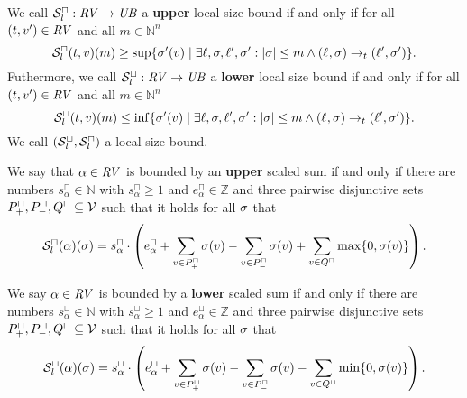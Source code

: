 \begin{definition}
  We call ${\mathcal{S}^\sqcap_l}: \mathit{RV} \rightarrow \mathit{UB}$ a \textbf{upper} local size bound if and only if for all $(t, v') \in \mathit{RV}$ and all $m \in \mathbb{N}^n$
  \[ {\mathcal{S}^\sqcap_l}(t, v)(m) \geq \sup \lbrace \sigma'(v) \mid \exists \ell, \sigma, \ell', \sigma': \left|\sigma\right| \leq m \wedge (\ell_{}, \sigma_{}) \rightarrow_t (\ell', \sigma') \rbrace. \]
  Futhermore, we call ${\mathcal{S}^\sqcup_l}: \mathit{RV} \rightarrow \mathit{UB}$ a \textbf{lower} local size bound if and only if for all $(t, v') \in \mathit{RV}$ and all $m \in \mathbb{N}^n$
  \[ {\mathcal{S}^\sqcup_l}(t, v)(m) \leq \inf \lbrace \sigma'(v) \mid \exists \ell, \sigma, \ell', \sigma': \left|\sigma\right| \leq m \wedge (\ell_{}, \sigma_{}) \rightarrow_t (\ell', \sigma') \rbrace. \]
  We call ${({\mathcal{S}^\sqcup_l}, {\mathcal{S}^\sqcap_l})}$ a local size bound.
\end{definition}

\begin{definition}
  We say that $\alpha \in \mathit{RV}$ is bounded by an \textbf{upper} scaled sum if and only if there are numbers $s^\sqcap_\alpha \in \mathbb{N}$ with $s^\sqcap_\alpha \geq 1$ and $e^\sqcap_\alpha \in \mathbb{Z}$ and three pairwise disjunctive sets $P_+^\sqcap, P_-^\sqcap, Q^\sqcap \subseteq \mathcal{V}$ such that it holds for all $\sigma$ that
  \[ {\mathcal{S}^\sqcap_l}(\alpha)(\sigma) = s^\sqcap_\alpha \cdot \left( e^\sqcap_\alpha + \sum_{v \in P_+^\sqcap} \sigma(v) - \sum_{v \in P_-^\sqcap} \sigma(v) + \sum_{v \in Q^\sqcap} \max \lbrace 0,\sigma(v) \rbrace \right). \]

  We say $\alpha \in \mathit{RV}$ is bounded by a \textbf{lower} scaled sum if and only if there are numbers $s^\sqcup_\alpha \in \mathbb{N}$ with $s^\sqcup_\alpha \geq 1$ and $e^\sqcup_\alpha \in \mathbb{Z}$ and three pairwise disjunctive sets $P_+^\sqcap, P_-^\sqcap, Q^\sqcap \subseteq \mathcal{V}$ such that it holds for all $\sigma$ that
  \[ {\mathcal{S}^\sqcup_l}(\alpha)(\sigma) = s^\sqcup_\alpha \cdot \left( e^\sqcup_\alpha + \sum_{v \in P_+^\sqcup} \sigma(v) - \sum_{v \in P_-^\sqcap} \sigma(v) - \sum_{v \in Q^\sqcup} \min \lbrace 0,\sigma(v) \rbrace \right). \]
\end{definition}
